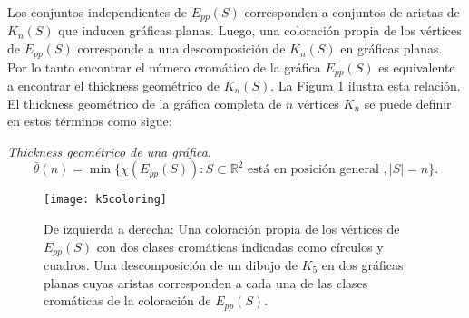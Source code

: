 Los conjuntos independientes de $E_{pp}(S)$ corresponden a conjuntos de aristas
de $K_n(S)$ que inducen gráficas planas. Luego, una coloración propia de los
vértices de $E_{pp}(S)$ corresponde a una descomposición de $K_n(S)$ en
gráficas planas.
Por lo tanto encontrar el número cromático de la gráfica
$E_{pp}(S)$ es equivalente a encontrar el thickness geométrico de $K_n(S)$.
La Figura \ref{fig:k5coloring} ilustra esta relación.
El thickness geométrico de la gráfica completa de $n$ vértices $K_n$ se puede
definir en estos términos como sigue:
\begin{definition}{\emph{Thickness geométrico de una gráfica}.}
  \[\bar{\theta}(n) = \min\{ \chi(E_{pp}(S)): S \subset \mathbb{R}^2 \text{ está en posición general }, |S|=n \}.\]
\end{definition}
\begin{figure}
  \centering
  \texttt{[image: k5coloring]}
  \caption{De izquierda a derecha: Una coloración propia de los vértices de $E_{pp}(S)$ con dos
  clases cromáticas indicadas como círculos y cuadros.
  Una descomposición de un dibujo de $K_5$ en dos gráficas planas
  cuyas aristas corresponden a cada una de las clases cromáticas de la coloración
  de $E_{pp}(S)$.}
  \label{fig:k5coloring}
\end{figure}




